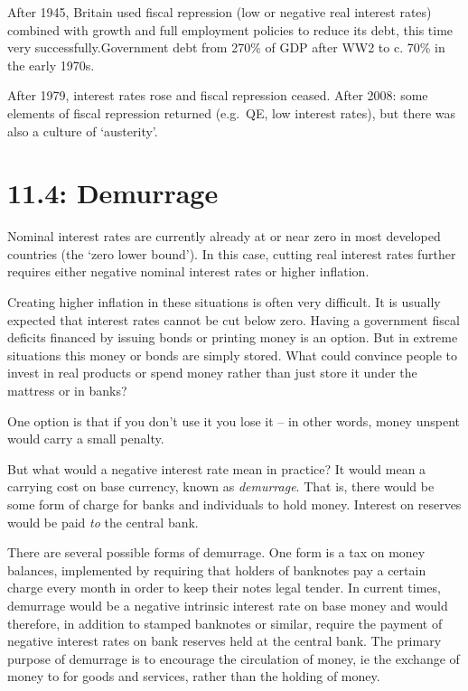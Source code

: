 \documentclass[]{tufte-handout}
\begin{document}
After 1945, Britain used fiscal repression (low or negative real
interest rates) combined with growth and full employment policies to
reduce its debt, this time very successfully.Government debt from 270\%
of GDP after WW2 to c. 70\% in the early 1970s.

After 1979, interest rates rose and fiscal repression ceased. After
2008: some elements of fiscal repression returned (e.g.~QE, low interest
rates), but there was also a culture of `austerity'.

\hypertarget{demurrage}{%
\section{11.4: Demurrage}\label{demurrage}}

Nominal interest rates are currently already at or near zero in most
developed countries (the `zero lower bound'). In this case, cutting real
interest rates further requires either negative nominal interest rates
or higher inflation.

Creating higher inflation in these situations is often very difficult.
It is usually expected that interest rates cannot be cut below zero.
Having a government fiscal deficits financed by issuing bonds or
printing money is an option. But in extreme situations this money or
bonds are simply stored. What could convince people to invest in real
products or spend money rather than just store it under the mattress or
in banks?

One option is that if you don't use it you lose it -- in other words,
money unspent would carry a small penalty.

But what would a negative interest rate mean in practice? It would mean
a carrying cost on base currency, known as \emph{demurrage}. That is,
there would be some form of charge for banks and individuals to hold
money. Interest on reserves would be paid \emph{to} the central bank.

There are several possible forms of demurrage. One form is a tax on
money balances, implemented by requiring that holders of banknotes pay a
certain charge every month in order to keep their notes legal tender. In
current times, demurrage would be a negative intrinsic interest rate on
base money and would therefore, in addition to stamped banknotes or
similar, require the payment of negative interest rates on bank reserves
held at the central bank. The primary purpose of demurrage is to
encourage the circulation of money, ie the exchange of money to for
goods and services, rather than the holding of money.
\end{document}
